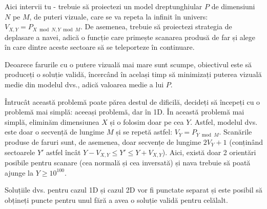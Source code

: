 \documentclass[12pt]{article}
\begin{document}
Aici intervii tu - trebuie să proiectezi un model dreptunghiular $P$ de dimensiuni $N$ pe $M$, de puteri vizuale,  care se va repeta la infinit în univers: $V_{X, Y} = P_{X \bmod N, Y \bmod M}$. De asemenea, trebuie să proiectezi strategia de deplasare a navei, adică o funcție care primește scanarea produsă de far și alege în care dintre aceste sectoare să se teleporteze în continuare.


Deoarece farurile cu o putere vizuală mai mare sunt scumpe, obiectivul este să produceți o soluție validă, încercând în același timp să minimizați puterea vizuală medie din modelul dvs., adică valoarea medie a lui $P$.


Întrucât această problemă poate părea destul de dificilă, decideți să începeți cu o problemă mai simplă: aceeași problemă, dar în 1D. În această problemă mai simplă, eliminăm dimensiunea $X$ și o folosim doar pe cea $Y$. Astfel, modelul dvs. este doar o secvență de lungime $M$ și se repetă astfel: $V_Y = P_{Y \bmod M}$. Scanările produse de faruri sunt, de asemenea, doar secvențe de lungime $2V_Y + 1$ (conținând sectoarele $Y'$ astfel încât $Y - V_{X, Y} \leq Y' \leq Y + V_{X, Y}$). Aici, există doar 2 orientări posibile pentru scanare (cea normală și cea inversată) și nava trebuie să poată ajunge la $Y \geq 10^{100}$.


Soluțiile dvs. pentru cazul 1D și cazul 2D vor fi punctate separat și este posibil să obțineți puncte pentru unul fără a avea o soluție validă pentru celălalt.
\end{document}
